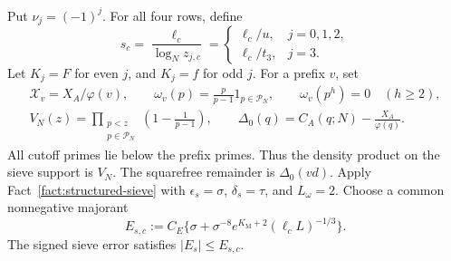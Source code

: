 Put $\nu_j=(-1)^j$.
For all four rows, define
\begin{equation}\label{eq:l3-common-sifting-ratio}
 s_c=\frac{\ell_c}{\log_N z_{j,c}}
 =\begin{cases}\ell_c/u,&j=0,1,2,\\ \ell_c/t_3,&j=3.\end{cases}
\end{equation}
Let $K_j=F$ for even $j$, and $K_j=f$ for odd $j$.
For a prefix $v$, set
\begin{equation}\label{eq:l3-density}
\begin{gathered}
 \mathcal X_v=X_A/\varphi(v),\qquad
 \omega_v(p)=\frac p{p-1}1_{p\in\mathcal P_N},
 \qquad \omega_v(p^h)=0\quad(h\ge2),\\
 V_N(z)=\prod_{\substack{p<z\\p\in\mathcal P_N}}
                     \left(1-\frac1{p-1}\right),\qquad
 \Delta_0(q)=C_A(q;N)-\frac{X_A}{\varphi(q)}.
\end{gathered}
\end{equation}
All cutoff primes lie below the prefix primes.
Thus the density product on the sieve support is $V_N$.
The squarefree remainder is $\Delta_0(vd)$.
Apply Fact~\ref{fact:structured-sieve} with
$\epsilon_s=\sigma$, $\delta_s=\tau$, and $L_\omega=2$.
Choose a common nonnegative majorant
\begin{equation}\label{eq:l3-sieve-error}
 E_{s,c}:= C_E\{\sigma+
     \sigma^{-8}e^{K_{\mathrm M}+2}(\ell_cL)^{-1/3}\}.
\end{equation}
The signed sieve error satisfies \(|E_s|\le E_{s,c}\).
